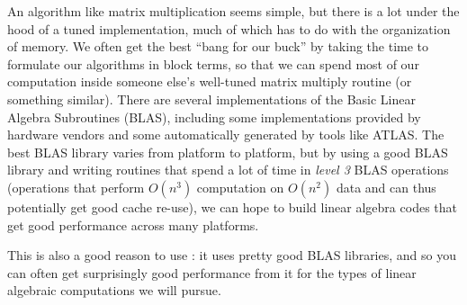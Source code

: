 \documentclass[12pt, leqno]{article} %
\begin{document}
An algorithm like matrix multiplication seems simple, but there is a
lot under the hood of a tuned implementation, much of which has to do
with the organization of memory.  We often get the best ``bang for our
buck'' by taking the time to formulate our algorithms in block terms,
so that we can spend most of our computation inside someone else's
well-tuned matrix multiply routine (or something similar).  There are
several implementations of the Basic Linear Algebra Subroutines
(BLAS), including some implementations provided by hardware vendors
and some automatically generated by tools like ATLAS.  The best BLAS
library varies from platform to platform, but by using a good BLAS
library and writing routines that spend a lot of time in {\em level 3}
BLAS operations (operations that perform $O(n^3)$ computation on
$O(n^2)$ data and can thus potentially get good cache re-use), we can
hope to build linear algebra codes that get good performance across
many platforms.

This is also a good reason to use \matlab: it uses pretty good BLAS libraries,
and so you can often get surprisingly good performance from it for the types
of linear algebraic computations we will pursue.



\end{document}
